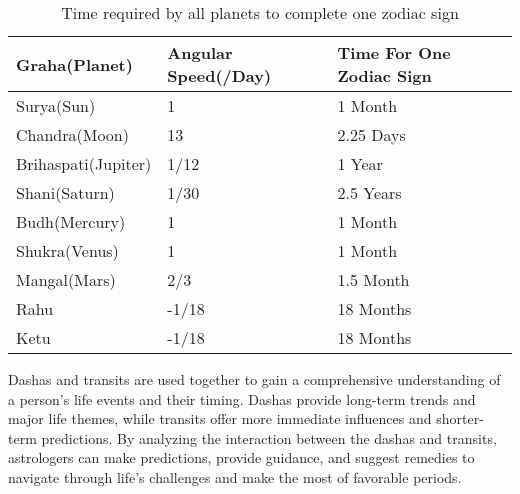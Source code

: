 \noindent
\begin{table}[H]
	\begin{tabularx}{\columnwidth}{|M|M|M|}
		\hline
		\textbf{Graha(Planet)} & \textbf{Angular Speed(\textdegree/Day)} & \textbf{Time For One Zodiac Sign} \\
		\hline
		Surya(Sun) & 1 & 1 Month \\
		\hline
		Chandra(Moon) & 13 & 2.25 Days \\
		\hline
		Brihaspati(Jupiter) & 1/12 & 1 Year \\
		\hline
		Shani(Saturn) & 1/30 & 2.5 Years \\
		\hline
		Budh(Mercury) & 1 & 1 Month \\
		\hline
		Shukra(Venus) & 1 & 1 Month \\
		\hline
		Mangal(Mars) & 2/3 & 1.5 Month \\
		\hline
		Rahu & -1/18 & 18 Months \\
		\hline
		Ketu & -1/18 & 18 Months \\
		\hline
	\end{tabularx}
	\caption{Time required by all planets to complete one zodiac sign}
	\label{Table:table}
\end{table}

Dashas and transits are used together to gain a comprehensive understanding of a person's life events and their timing. Dashas provide long-term trends and major life themes, while transits offer more immediate influences and shorter-term predictions. By analyzing the interaction between the dashas and transits, astrologers can make predictions, provide guidance, and suggest remedies to navigate through life's challenges and make the most of favorable periods.